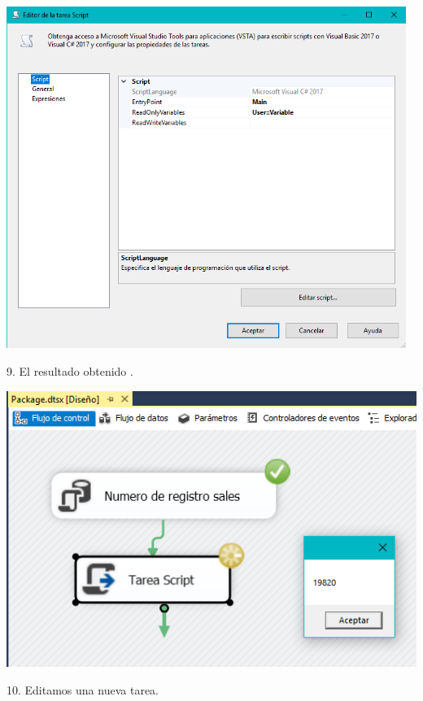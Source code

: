 	\begin{center}
	\includegraphics[width=13cm]{./Imagenes/img21}
	\end{center}	
9. El resultado obtenido .\\
	\begin{center}
	\includegraphics[width=14cm]{./Imagenes/img22}
	\end{center}	
10. Editamos una nueva tarea. \\
